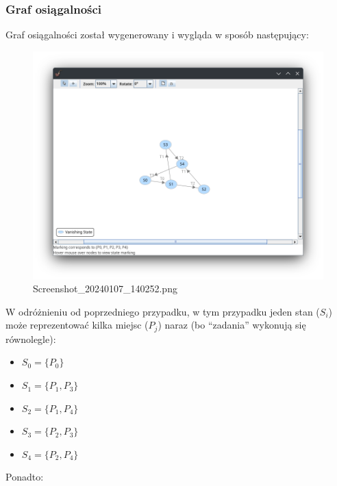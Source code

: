 \documentclass[11pt]{article}
\providecommand{\tightlist}{%
      \setlength{\itemsep}{0pt}\setlength{\parskip}{0pt}}
\begin{document}
    \hypertarget{graf-osiux105galnoux15bci}{%
\subsubsection{Graf osiągalności}\label{graf-osiux105galnoux15bci}}

Graf osiągalności został wygenerowany i wygląda w sposób następujący:

\begin{figure}
\centering
\includegraphics{Screenshot_20240107_140252.png}
\caption{Screenshot\_20240107\_140252.png}
\end{figure}

W odróżnieniu od poprzedniego przypadku, w tym przypadku jeden stan
(\(S_i\)) może reprezentować kilka miejsc (\(P_j\)) naraz (bo
``zadania'' wykonują się równolegle):

\begin{itemize}
\tightlist
\item
  \(S_0 = \{P_0\}\)
\item
  \(S_1 = \{P_1, P_3\}\)
\item
  \(S_2 = \{P_1, P_4\}\)
\item
  \(S_3 = \{P_2, P_3\}\)
\item
  \(S_4 = \{P_2, P_4\}\)
\end{itemize}

Ponadto:
\end{document}
